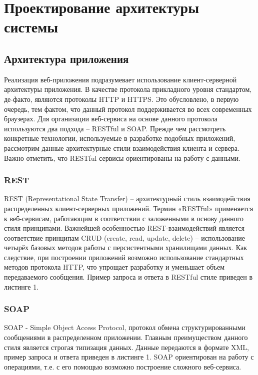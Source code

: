 \chapter{Проектирование архитектуры системы}

\section{Архитектура приложения}

Реализация веб-приложения подразумевает использование клиент-серверной архитектуры приложения. В качестве протокола прикладного уровня стандартом, де-факто, являются протоколы HTTP и HTTPS. Это обусловлено, в первую очередь, тем фактом, что данный протокол поддерживается во всех современных браузерах. Для организации веб-сервиса на основе данного протокола используются два подхода – RESTful и SOAP. Прежде чем рассмотреть конкретные технологии, используемые в разработке подобных приложений, рассмотрим данные архитектурные стили взаимодействия клиента и сервера. Важно отметить, что RESTful сервисы ориентированы на работу с данными.

\subsection{REST}

REST (Representational State Transfer) – архитектурный стиль взаимодействия распределенных клиент-серверных приложений. Термин «RESTful» применяется к веб-сервисам, работающим в соответствии с заложенными в основу данного стиля принципами. Важнейшей особенностью REST-взаимодействий является соответствие принципам CRUD (create, read, update, delete) – использование четырёх базовых методов работы с персистентными хранилищами данных. Как следствие, при построении приложений возможно использование стандартных методов протокола HTTP, что упрощает разработку и уменьшает объем передаваемого сообщения. Пример запроса и ответа в RESTful стиле приведен в листинге 1.

\subsection{SOAP}

SOAP - Simple Object Access Protocol, протокол обмена структурированными сообщениями в распределенном приложении. Главным преимуществом данного стиля является строгая типизация данных. Данные передаются в формате XML, пример запроса и ответа приведен в листинге 1. SOAP ориентирован на работу с операциями, т.е. с его помощью возможно построение сложного веб-сервиса. 

